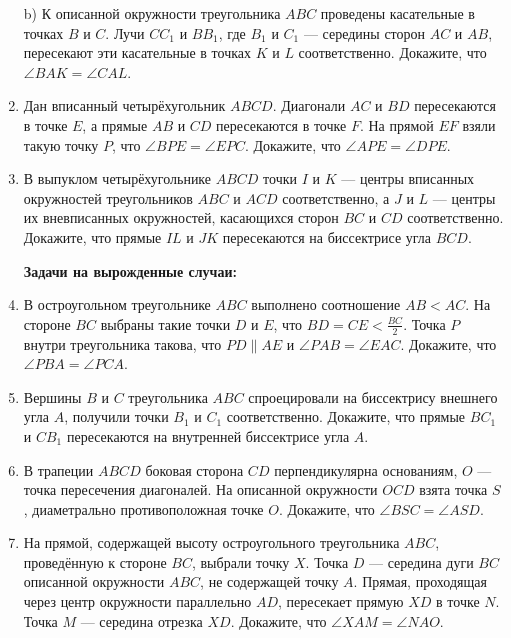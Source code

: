 \documentclass{article}
\begin{document}
\begin{enumerate}[label*=\protect\fbox{\arabic{enumi}}]
b) К описанной окружности треугольника $ABC$ проведены касательные в точках $B$ и $C$. Лучи $CC_1$ и $BB_1$, где $B_1$ и $C_1$ — середины сторон $AC$ и $AB$, пересекают эти касательные в точках $K$ и $L$ соответственно. Докажите, что $\angle BAK=\angle CAL$.

\item Дан вписанный четырёхугольник $ABCD$. Диагонали $AC$ и $BD$ пересекаются в точке $E$, а прямые $AB$ и $CD$ пересекаются в точке $F$. На прямой $EF$ взяли такую точку $P$, что $\angle BPE=\angle EPC$. Докажите, что $\angle APE=\angle DPE$.

\item В выпуклом четырёхугольнике $ABCD$ точки $I$ и $K$ — центры вписанных окружностей треугольников $ABC$ и $ACD$ соответственно, а $J$ и $L$ — центры их вневписанных окружностей, касающихся сторон $BC$ и $CD$ соответственно. Докажите, что прямые $IL$ и $JK$ пересекаются на биссектрисе угла $BCD$.

\textbf{Задачи на вырожденные случаи:}

\item В остроугольном треугольнике \(ABC\) выполнено соотношение \(AB < AC\). На стороне \(BC\) выбраны такие точки \(D\) и \(E\), что \(BD = CE < \frac{BC}{2}\). Точка \(P\) внутри треугольника такова, что \(PD \parallel AE\) и \(\angle PAB = \angle EAC\). Докажите, что \(\angle PBA = \angle PCA\).

\item Вершины \(B\) и \(C\) треугольника \(ABC\) спроецировали на биссектрису внешнего угла \(A\), получили точки \(B_1\) и \(C_1\) соответственно. Докажите, что прямые \(BC_1\) и \(CB_1\) пересекаются на внутренней биссектрисе угла \(A\).

\item В трапеции \(ABCD\) боковая сторона \(CD\) перпендикулярна основаниям, \(O\) — точка пересечения диагоналей. На описанной окружности \(OCD\) взята точка \(S\), диаметрально противоположная точке \(O\). Докажите, что \(\angle BSC = \angle ASD\).

\item На прямой, содержащей высоту остроугольного треугольника \(ABC\), проведённую к стороне \(BC\), выбрали точку \(X\). Точка \(D\) — середина дуги \(BC\) описанной окружности \(ABC\), не содержащей точку \(A\). Прямая, проходящая через центр окружности параллельно \(AD\), пересекает прямую \(XD\) в точке \(N\). Точка \(M\) — середина отрезка \(XD\). Докажите, что \(\angle XAM = \angle NAO\).


\end{enumerate}
\end{document}
